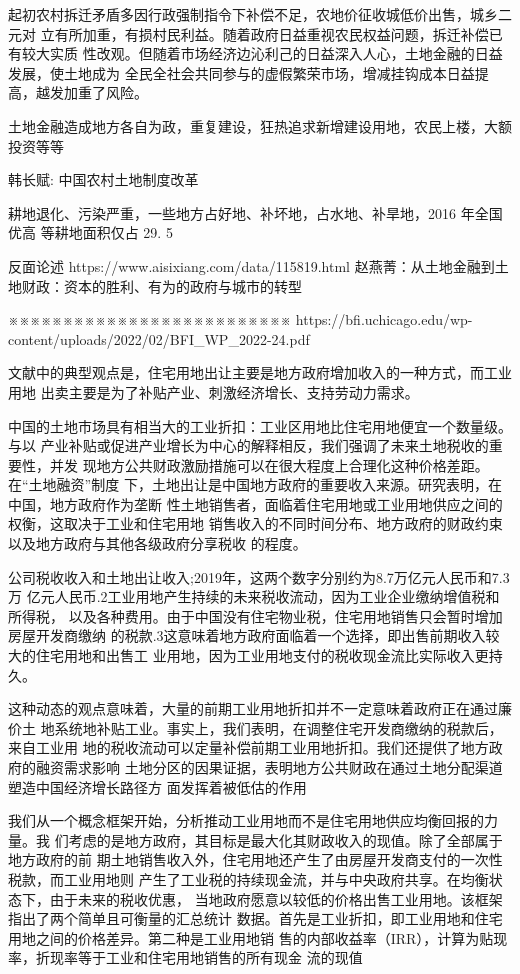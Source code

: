 起初农村拆迁矛盾多因行政强制指令下补偿不足，农地价征收城低价出售，城乡二元对
立有所加重，有损村民利益。随着政府日益重视农民权益问题，拆迁补偿已有较大实质
性改观。但随着市场经济边沁利己的日益深入人心，土地金融的日益发展，使土地成为
全民全社会共同参与的虚假繁荣市场，增减挂钩成本日益提高，越发加重了风险。


土地金融造成地方各自为政，重复建设，狂热追求新增建设用地，农民上楼，大额投资等等


韩长赋: 中国农村土地制度改革

耕地退化、污染严重，一些地方占好地、补坏地，占水地、补旱地，2016 年全国优高
等耕地面积仅占 29. 5%




反面论述
https://www.aisixiang.com/data/115819.html
赵燕菁：从土地金融到土地财政：资本的胜利、有为的政府与城市的转型

※※※※※※※※※※※※※※※※※※※※※※※※※※
https://bfi.uchicago.edu/wp-content/uploads/2022/02/BFI_WP_2022-24.pdf

文献中的典型观点是，住宅用地出让主要是地方政府增加收入的一种方式，而工业用地
出卖主要是为了补贴产业、刺激经济增长、支持劳动力需求。

中国的土地市场具有相当大的工业折扣：工业区用地比住宅用地便宜一个数量级。与以
产业补贴或促进产业增长为中心的解释相反，我们强调了未来土地税收的重要性，并发
现地方公共财政激励措施可以在很大程度上合理化这种价格差距。在“土地融资”制度
下，土地出让是中国地方政府的重要收入来源。研究表明，在中国，地方政府作为垄断
性土地销售者，面临着住宅用地或工业用地供应之间的权衡，这取决于工业和住宅用地
销售收入的不同时间分布、地方政府的财政约束以及地方政府与其他各级政府分享税收
的程度。

公司税收收入和土地出让收入;2019年，这两个数字分别约为8.7万亿元人民币和7.3万
亿元人民币.2工业用地产生持续的未来税收流动，因为工业企业缴纳增值税和所得税，
以及各种费用。由于中国没有住宅物业税，住宅用地销售只会暂时增加房屋开发商缴纳
的税款.3这意味着地方政府面临着一个选择，即出售前期收入较大的住宅用地和出售工
业用地，因为工业用地支付的税收现金流比实际收入更持久。

这种动态的观点意味着，大量的前期工业用地折扣并不一定意味着政府正在通过廉价土
地系统地补贴工业。事实上，我们表明，在调整住宅开发商缴纳的税款后，来自工业用
地的税收流动可以定量补偿前期工业用地折扣。我们还提供了地方政府的融资需求影响
土地分区的因果证据，表明地方公共财政在通过土地分配渠道塑造中国经济增长路径方
面发挥着被低估的作用

我们从一个概念框架开始，分析推动工业用地而不是住宅用地供应均衡回报的力量。我
们考虑的是地方政府，其目标是最大化其财政收入的现值。除了全部属于地方政府的前
期土地销售收入外，住宅用地还产生了由房屋开发商支付的一次性税款，而工业用地则
产生了工业税的持续现金流，并与中央政府共享。在均衡状态下，由于未来的税收优惠，
当地政府愿意以较低的价格出售工业用地。该框架指出了两个简单且可衡量的汇总统计
数据。首先是工业折扣，即工业用地和住宅用地之间的价格差异。第二种是工业用地销
售的内部收益率（IRR），计算为贴现率，折现率等于工业和住宅用地销售的所有现金
流的现值

